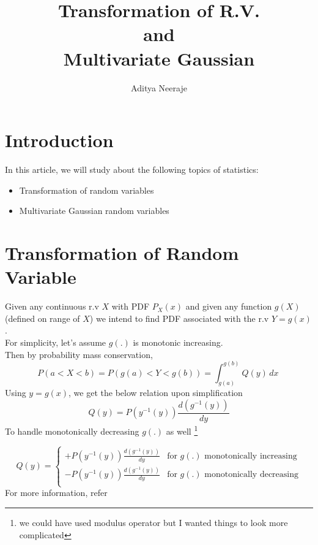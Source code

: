 \documentclass{article}
\title{Transformation of R.V. \\ and \\ Multivariate Gaussian}
\author{Aditya Neeraje}
\date{}
\begin{document}
\pagestyle{fancy}
\maketitle


\tableofcontents
\clearpage

\section{Introduction}
In this article, we will study about the following topics of statistics:
\begin{itemize}
    \item Transformation of random variables
    \item Multivariate Gaussian random variables
\end{itemize}

\section{Transformation of Random Variable}
Given any continuous r.v $X$ with PDF $P_{X}(x)$ and given any function $g(X)$ (defined on range of $X$) we intend to find PDF associated with the r.v $Y = g(x)$.\\
For simplicity, let's assume $g(.)$ is monotonic increasing.\\
Then by probability mass conservation,
\[ P(a < X < b) = P(g(a) < Y < g(b)) = \int_{g(a)}^{g(b)}Q(y) \,dx\ \]
Using $y=g(x)$, we get the below relation upon simplification
\[
    Q(y) = P(y^{-1}(y))\frac{d(g^{-1}(y))}{dy}
\]
To handle monotonically decreasing $g(.)$ as well
\footnote{\label{foot:ref_1}we could have used modulus operator but I wanted things to look more complicated}

\begin{equation}
    Q(y) = 
    \begin{cases}
        +P(y^{-1}(y))\frac{d(g^{-1}(y))}{dy} & \text{for } g(.) \text{ monotonically increasing}\\
        -P(y^{-1}(y))\frac{d(g^{-1}(y))}{dy} & \text{for } g(.) \text{ monotonically decreasing}\\
    \end{cases}
\end{equation}
For more information, refer \cite{url:transformations}
\end{document}
